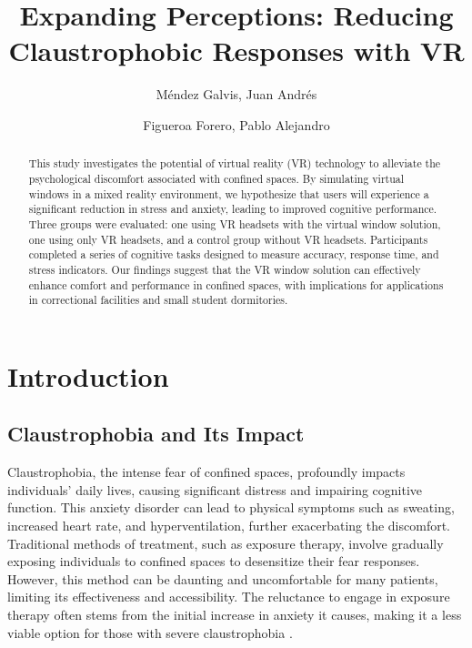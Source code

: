 \documentclass[runningheads]{llncs}
\begin{document}
%
\title{Expanding Perceptions: Reducing Claustrophobic Responses with VR}
%
%
\author{Méndez Galvis, Juan Andrés \and Figueroa Forero, Pablo Alejandro }
%
%
%
\maketitle              %
%
\begin{abstract}
This study investigates the potential of virtual reality (VR) technology to alleviate the psychological discomfort associated with confined spaces. By simulating virtual windows in a mixed reality environment, we hypothesize that users will experience a significant reduction in stress and anxiety, leading to improved cognitive performance. Three groups were evaluated: one using VR headsets with the virtual window solution, one using only VR headsets, and a control group without VR headsets. Participants completed a series of cognitive tasks designed to measure accuracy, response time, and stress indicators. Our findings suggest that the VR window solution can effectively enhance comfort and performance in confined spaces, with implications for applications in correctional facilities and small student dormitories.

\end{abstract}
%
%
%
\section{Introduction}

\subsection{Claustrophobia and Its Impact}

Claustrophobia, the intense fear of confined spaces, profoundly impacts individuals' daily lives, causing significant distress and impairing cognitive function. This anxiety disorder can lead to physical symptoms such as sweating, increased heart rate, and hyperventilation, further exacerbating the discomfort. Traditional methods of treatment, such as exposure therapy, involve gradually exposing individuals to confined spaces to desensitize their fear responses. However, this method can be daunting and uncomfortable for many patients, limiting its effectiveness and accessibility. The reluctance to engage in exposure therapy often stems from the initial increase in anxiety it causes, making it a less viable option for those with severe claustrophobia \cite{Malbos2008}.
\end{document}
